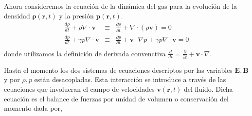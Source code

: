 \documentclass[a4paper,11pt]{report}
\begin{document}
Ahora consideremos la ecuación de la dinámica del gas para la evolución de la densidad $\boldsymbol{\rho}(\boldsymbol{r},t)$ y la presión $\boldsymbol{p}(\boldsymbol{r},t)$.
\begin{eqnarray}
\frac{d\rho}{dt} + \rho \nabla \cdot \boldsymbol{v} &\equiv& \frac{\partial \rho}{\partial t} +\nabla \cdot (\rho \boldsymbol{v}) = 0\\
\frac{d p}{dt} + \gamma p \nabla \cdot \boldsymbol{v} &\equiv& \frac{\partial p}{\partial t} + \boldsymbol{v} \cdot \nabla p + \gamma p \nabla \cdot \boldsymbol{v} = 0\\
\end{eqnarray}
donde utilizamos la definición de derivada convenctiva $\frac{d}{dt}=\frac{\partial}{\partial t} + \boldsymbol{v} \cdot \nabla$. 

Hasta el momento los dos sistemas de ecuaciones descriptos por las variables $\boldsymbol{E}, \boldsymbol{B}$ y por $\rho, p$ están desacopladas. Esta interacción se introduce a través de las ecuaciones que involucran el campo de velocidades $\boldsymbol{v}(\boldsymbol{r},t)$ del fluido. Dicha ecuación es el balance de fuerzas por unidad de volumen o conservación del momento dada por,
\end{document}
